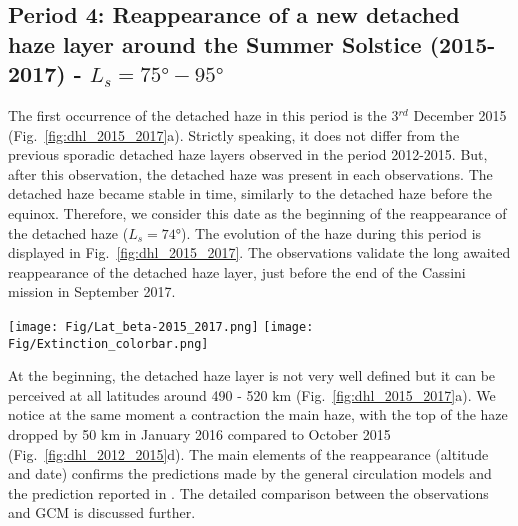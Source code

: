 \subsection{Period 4: Reappearance of a new detached haze layer around the Summer Solstice (2015-2017) - $L_s=\ang{75}-\ang{95}$}

The first occurrence of the detached haze in this period is the 3$^{rd}$ December 2015
(Fig.~\ref{fig:dhl_2015_2017}a). Strictly speaking, it
does not differ from the previous sporadic detached haze layers observed in the period 2012-2015. But, after
this observation, the detached haze was present in each observations. The detached haze became stable in time,
similarly to the detached haze before the equinox. Therefore, we consider this date as the beginning of the
reappearance of the detached haze ($L_s=\ang{74}$). The evolution of the haze during this period is displayed in
Fig.~\ref{fig:dhl_2015_2017}. The observations validate the long awaited reappearance of the detached haze layer,
just before the end of the Cassini mission in September 2017.

\begin{figure*}[!ht]
    \centering
    \texttt{[image: Fig/Lat\_beta-2015\_2017.png]}
    \texttt{[image: Fig/Extinction\_colorbar.png]}\vspace{-.3cm}
    \caption{Same as the figures~\ref{fig:dhl_2004_2008}, \ref{fig:dhl_2008_2012}
    and~\ref{fig:dhl_2012_2015} for 6 images taken between 2015 and 2017
    ($L_s=\ang{75}-\ang{95}$) during the reappearance of the DHL.
    The image \textbf{N1884018021\_1} is one of the very last observation of Titan before
    the end of the Cassini mission in September 2017.}
    \label{fig:dhl_2015_2017}
\end{figure*}

At the beginning, the detached haze layer is not very well defined but it can be perceived at all latitudes
around 490 - 520 km (Fig.~\ref{fig:dhl_2015_2017}a). We notice at the same moment a contraction
the main haze, with the top of the haze dropped by 50 km in January 2016 compared to October 2015
(Fig.~\ref{fig:dhl_2012_2015}d). The main elements of the reappearance (altitude and date) confirms the
predictions made by the general circulation models \citep{Lebonnois2012,Larson2015} and the prediction
reported in \cite{West2011}. The detailed comparison between the observations and GCM is discussed further.

